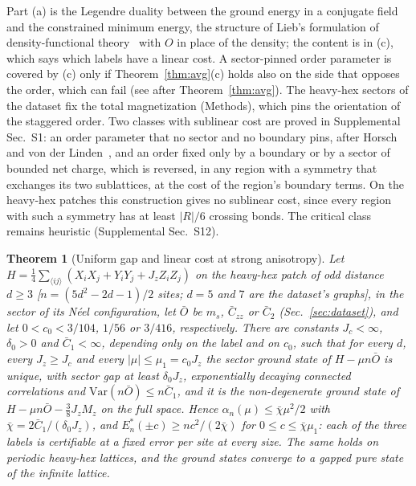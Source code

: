 \documentclass[aps,prx,twocolumn,10pt,superscriptaddress,nofootinbib,longbibliography,floatfix]{revtex4-2}
\newtheorem{theorem}{Theorem}
\theoremstyle{remark}
\newcommand{\Jz}{J_z}
\newcommand{\ms}{m_s}
\newcommand{\Czz}{\bar C_{zz}}
\newcommand{\Ctwo}{\bar C_{2}}
\begin{document}
Part (a) is the Legendre duality between the ground energy in a conjugate field and the constrained minimum energy,
the structure of Lieb's formulation of density-functional theory~\cite{lieb1983} with $O$ in place of the density;
the content is in (c), which says which labels have a linear cost.
A sector-pinned order parameter is covered by (c) only if Theorem~\ref{thm:avg}(c) holds also on the side that
opposes the order, which can fail (see after Theorem~\ref{thm:avg}). The heavy-hex sectors of the dataset fix the total
magnetization (Methods), which pins the orientation of the staggered order.
Two classes with sublinear cost are proved in Supplemental Sec.~S1: an order parameter that no sector and no
boundary pins, after Horsch and von der Linden~\cite{horsch1988,koma1994}, and an order fixed only by a boundary
or by a sector of bounded net charge, which is reversed, in any region with a symmetry that exchanges its two
sublattices, at the cost of the region's boundary terms. On the heavy-hex patches this construction gives no
sublinear cost, since every region with such a symmetry has at least $|R|/6$ crossing bonds. The critical class %
remains heuristic (Supplemental Sec.~S12).

\begin{theorem}[Uniform gap and linear cost at strong anisotropy]
\label{thm:strong}
Let $H=\frac14\sum_{\langle ij\rangle}(X_iX_j+Y_iY_j+\Jz Z_iZ_j)$ on the heavy-hex patch of odd distance $d\ge3$
[$n=(5d^2-2d-1)/2$ sites; $d=5$ and $7$ are the dataset's graphs], in the sector of its N\'eel configuration, let %
$\bar O$ be $\ms$, $\Czz$ or $\Ctwo$ (Sec.~\ref{sec:dataset}), and let $0<c_0<3/104$, $1/56$ or $3/416$, %
respectively. There are constants $J_c<\infty$, $\delta_0>0$ and $\bar C_1<\infty$, depending only on the label and
on $c_0$, such that for every $d$, every $\Jz\ge J_c$ and every $|\mu|\le\mu_1=c_0\Jz$ the sector ground state of
$H-\mu n\bar O$ is unique, with sector gap at least $\delta_0\Jz$, exponentially decaying connected correlations and
$\mathrm{Var}(n\bar O)\le n\bar C_1$, and it is the non-degenerate ground state of $H-\mu n\bar O-\frac38\Jz M_z$ on
the full space. Hence $\alpha_n(\mu)\le\bar\chi\mu^2/2$ with $\bar\chi=2\bar C_1/(\delta_0\Jz)$, and
$E^*_n(\pm c)\ge nc^2/(2\bar\chi)$ for $0\le c\le\bar\chi\mu_1$: each of the three labels is certifiable at a
fixed error per site at every size. The same holds on periodic heavy-hex lattices, and the ground states converge
to a gapped pure state of the infinite lattice.
\end{theorem}
\end{document}
